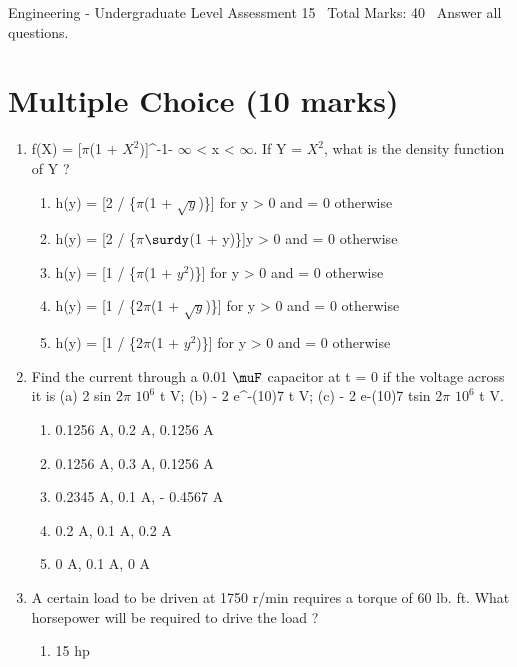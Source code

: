 \documentclass[12pt]{article}
\begin{document}
\begin{center}
Engineering - Undergraduate Level Assessment 15 \
Total Marks: 40 \
Answer all questions.
\end{center}

\section*{Multiple Choice (10 marks)}
\begin{enumerate}[label=\arabic*.]
\item f(X) = [\ensuremath{\pi}(1 + $X^2$)]^-1- \ensuremath{\infty} \textless{} x \textless{} \ensuremath{\infty}. If Y = $X^2$, what is the density function of Y ?
\begin{enumerate}[label=(\alph*)]
    \item h(y) = [2 / \{\ensuremath{\pi}(1 + \ensuremath{\sqrt{y}})\}] for y \textgreater{} 0 and = 0 otherwise
    \item h(y) = [2 / \{\ensuremath{\pi}\ensuremath{\surdy}(1 + y)\}]y \textgreater{} 0 and = 0 otherwise
    \item h(y) = [1 / \{\ensuremath{\pi}(1 + $y^2$)\}] for y \textgreater{} 0 and = 0 otherwise
    \item h(y) = [1 / \{2\ensuremath{\pi}(1 + \ensuremath{\sqrt{y}})\}] for y \textgreater{} 0 and = 0 otherwise
    \item h(y) = [1 / \{2\ensuremath{\pi}(1 + $y^2$)\}] for y \textgreater{} 0 and = 0 otherwise
\end{enumerate}
\item Find the current through a 0.01 \ensuremath{\muF} capacitor at t = 0 if the voltage across it is (a) 2 sin 2\ensuremath{\pi} $10^6$ t V; (b) - 2 e^-(10)7 t V; (c) - 2 e-(10)7 tsin 2\ensuremath{\pi} $10^6$ t V.
\begin{enumerate}[label=(\alph*)]
    \item 0.1256 A, 0.2 A, 0.1256 A
    \item 0.1256 A, 0.3 A, 0.1256 A
    \item 0.2345 A, 0.1 A, - 0.4567 A
    \item 0.2 A, 0.1 A, 0.2 A
    \item 0 A, 0.1 A, 0 A
\end{enumerate}
\item A certain load to be driven at 1750 r/min requires a torque of 60 lb. ft. What horsepower will be required to drive the load ?
\begin{enumerate}[label=(\alph*)]
    \item 15 hp

\end{enumerate}
\end{enumerate}
\end{document}
